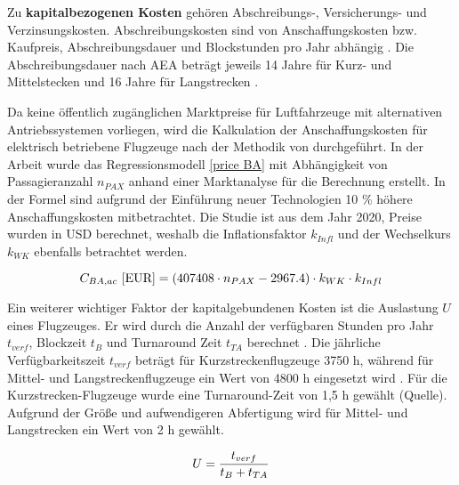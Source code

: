 Zu \textbf{kapitalbezogenen Kosten} gehören Abschreibungs-, Versicherungs- und Verzinsungskosten. 
Abschreibungskosten sind von Anschaffungskosten bzw. Kaufpreis, 
Abschreibungsdauer und Blockstunden pro Jahr abhängig \cite{conrady2019luftverkehr}.
Die Abschreibungsdauer nach AEA beträgt jeweils 14 Jahre für 
Kurz- und Mittelstecken und 16 Jahre für Langstrecken \cite{scholz_design_evaluation_doc}.

Da keine öffentlich zugänglichen Marktpreise für Luftfahrzeuge mit alternativen Antriebssystemen vorliegen, 
wird die Kalkulation der Anschaffungskosten für elektrisch betriebene Flugzeuge 
nach der Methodik von \cite{monjon2020conceptual} durchgeführt. 
In der Arbeit wurde das Regressionsmodell \eqref{price BA} mit Abhängigkeit von Passagieranzahl $n_{PAX}$ 
anhand einer Marktanalyse für die Berechnung erstellt. 
%
In der Formel sind aufgrund der Einführung neuer Technologien 10 \% höhere Anschaffungskosten mitbetrachtet. 
Die Studie ist aus dem Jahr 2020, Preise wurden in USD berechnet, 
weshalb die Inflationsfaktor $k_{Infl}$ und der Wechselkurs $k_{WK}$ 
ebenfalls betrachtet werden.

\begin{equation}
   {C_{BA,ac} ~[\text{EUR}]} = (407408 \cdot n_{PAX} - 2967.4) \cdot k_{WK} \cdot {k_{Infl}}\\
   \label{price BA}
\end{equation}

Ein weiterer wichtiger Faktor der kapitalgebundenen Kosten ist die Auslastung $U$ eines Flugzeuges. 
Er wird durch die Anzahl der verfügbaren Stunden pro Jahr $t_{verf}$, 
Blockzeit $t_B$ und Turnaround Zeit $t_{TA}$ berechnet \cite{minwoo2019analysis}. 
Die jährliche Verfügbarkeitszeit $t_{verf}$ beträgt für Kurzstreckenflugzeuge 3750 h, 
während für Mittel- und Langstreckenflugzeuge ein Wert von 4800 h eingesetzt wird \cite{scholz_design_evaluation_doc}. 
Für die Kurzstrecken-Flugzeuge wurde eine Turnaround-Zeit von 1,5 h gewählt (Quelle).
Aufgrund der Größe und aufwendigeren Abfertigung wird für Mittel- und Langstrecken ein Wert von 2 h gewählt.

\begin{equation}
   U = \frac{t_{verf}}{t_B + t_{TA}} \\
   \label{utilisation}
\end{equation}
 

